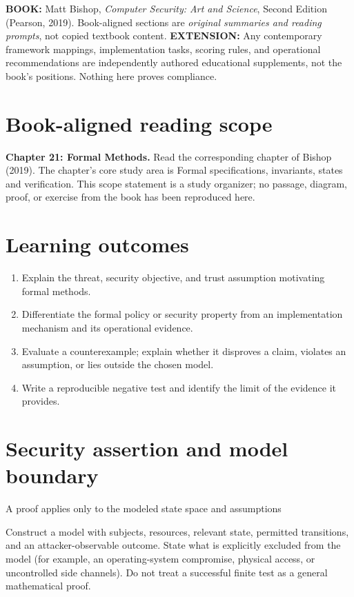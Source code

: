\documentclass[10pt,letterpaper]{article}
\begin{document}
\makedoctocpage
\begin{notebox}
\textbf{BOOK:} Matt Bishop, \emph{Computer Security: Art and Science}, Second Edition (Pearson, 2019). Book-aligned sections are \emph{original summaries and reading prompts}, not copied textbook content.
\textbf{EXTENSION:} Any contemporary framework mappings, implementation tasks, scoring rules, and operational recommendations are independently authored educational supplements, not the book's positions. Nothing here proves compliance.
\end{notebox}
\section{Book-aligned reading scope}
\textbf{Chapter 21: Formal Methods.} Read the corresponding chapter of Bishop (2019). The chapter's core study area is Formal specifications, invariants, states and verification. This scope statement is a study organizer; no passage, diagram, proof, or exercise from the book has been reproduced here.
\section{Learning outcomes}
\begin{enumerate}
\item Explain the threat, security objective, and trust assumption motivating formal methods.
\item Differentiate the formal policy or security property from an implementation mechanism and its operational evidence.
\item Evaluate a counterexample; explain whether it disproves a claim, violates an assumption, or lies outside the chosen model.
\item Write a reproducible negative test and identify the limit of the evidence it provides.
\end{enumerate}
\section{Security assertion and model boundary}
\begin{infobox}
A proof applies only to the modeled state space and assumptions
\end{infobox}
Construct a model with subjects, resources, relevant state, permitted transitions, and an attacker-observable outcome. State what is explicitly excluded from the model (for example, an operating-system compromise, physical access, or uncontrolled side channels). Do not treat a successful finite test as a general mathematical proof.
\end{document}
